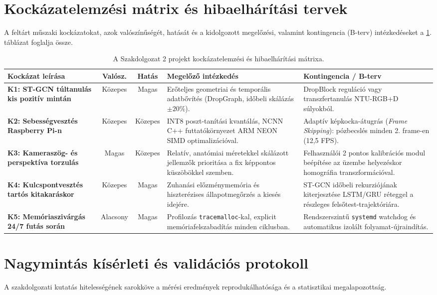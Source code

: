 \documentclass[12pt,a4paper,oneside]{report}
\begin{document}
\section{Kockázatelemzési mátrix és hibaelhárítási tervek}
A feltárt műszaki kockázatokat, azok valószínűségét, hatását és a kidolgozott megelőzési, valamint kontingencia (B-terv) intézkedéseket a \ref{tab:risks}. táblázat foglalja össze.

\begin{table}[H]
\centering
\small
\begin{tabularx}{\textwidth}{p{3.2cm}ccXX}
\toprule
\textbf{Kockázat leírása} & \textbf{Valósz.} & \textbf{Hatás} & \textbf{Megelőző intézkedés} & \textbf{Kontingencia / B-terv} \\
\midrule
\textbf{K1: ST-GCN túltanulás kis pozitív mintán} & Közepes & Magas & Erőteljes geometriai és temporális adatbővítés (DropGraph, időbeli skálázás $\pm 20\%$). & DropBlock reguláció vagy transzfertanulás NTU-RGB+D súlyokból. \\
\textbf{K2: Sebességvesztés Raspberry Pi-n} & Közepes & Közepes & INT8 poszt-tanítási kvantálás, NCNN C++ futtatókörnyezet ARM NEON SIMD optimalizációval. & Adaptív képkocka-átugrás (\textit{Frame Skipping}): pózbecslés minden 2. frame-en (12,5 FPS). \\
\textbf{K3: Kameraszög- és perspektíva torzulás} & Magas & Közepes & Relatív, anatómiai méretekkel skálázott jellemzők prioritása a fix képpontos küszöbökkel szemben. & Felhasználói 2 pontos kalibrációs modul beépítése az üzembe helyezéskor homográfia transzformációval. \\
\textbf{K4: Kulcspontvesztés tartós kitakaráskor} & Közepes & Magas & Zuhanási előzménymemória és hiszterézises állapotmegőrzés a kiesés idejére. & ST-GCN időbeli rekurziójának kiterjesztése LSTM/GRU réteggel a részleges felsőtest-trajektóriára. \\
\textbf{K5: Memóriaszivárgás 24/7 futás során} & Alacsony & Magas & Profilozás \texttt{tracemalloc}-kal, explicit memóriafelszabadítás minden ciklusban. & Rendszerszintű \texttt{systemd} watchdog és automatikus izolált folyamat-újraindítás. \\
\bottomrule
\end{tabularx}
\caption{A Szakdolgozat 2 projekt kockázatelemzési és hibaelhárítási mátrixa.}
\label{tab:risks}
\end{table}

\section{Nagymintás kísérleti és validációs protokoll}
A szakdolgozati kutatás hitelességének sarokköve a mérési eredmények reprodukálhatósága és a statisztikai megalapozottság.
\end{document}
